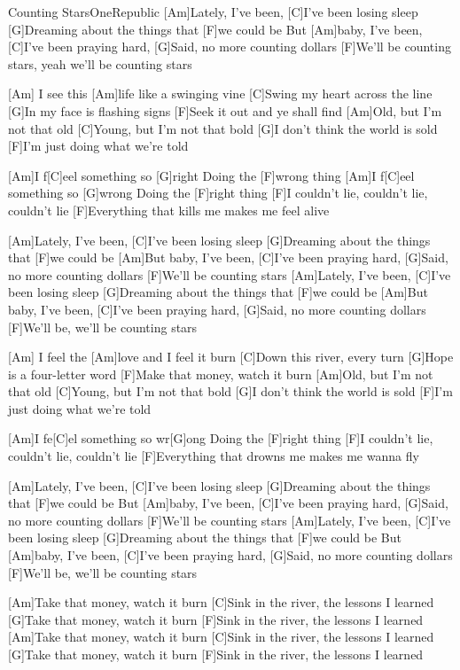 \documentclass[../main.tex]{subfiles}
\begin{document}
\begin{song}[4]{Counting Stars}{OneRepublic}{}
[Am]Lately, I've been, [C]I've been losing sleep
[G]Dreaming about the things that [F]we could be
But [Am]baby, I've been, [C]I've been praying hard,
[G]Said, no more counting dollars
[F]We'll be counting stars, yeah we'll be counting stars

[Am] \hh [C] \hh [G] \hh [F] \hh [Am] \hh [C] \hh [G] \hh [F] \hh
I see this [Am]life like a swinging vine
[C]Swing my heart across the line
[G]In my face is flashing signs
[F]Seek it out and ye shall find
[Am]Old, but I'm not that old
[C]Young, but I'm not that bold
[G]I don't think the world is sold
[F]I'm just doing what we're told

[Am]I\hspace{2.5mm} f[C]eel something so [G]right
Doing the [F]wrong thing
[Am]I\hspace{2.5mm} f[C]eel something so [G]wrong
Doing the [F]right thing
[F]I couldn't lie, couldn't lie, couldn't lie
[F]Everything that kills me makes me feel alive

[Am]Lately, I've been, [C]I've been losing sleep
[G]Dreaming about the things that [F]we could be
[Am]But baby, I've been, [C]I've been praying hard,
[G]Said, no more counting dollars
[F]We'll be counting stars
[Am]Lately, I've been, [C]I've been losing sleep
[G]Dreaming about the things that [F]we could be
[Am]But baby, I've been, [C]I've been praying hard,
[G]Said, no more counting dollars
[F]We'll be, we'll be counting stars

[Am] \hh [C] \hh [G] \hh [F] \hh [Am] \hh [C] \hh [G] \hh [F] \hh\pagebreak
I feel the [Am]love and I feel it burn
[C]Down this river, every turn
[G]Hope is a four-letter word
[F]Make that money, watch it burn
[Am]Old, but I'm not that old
[C]Young, but I'm not that bold
[G]I don't think the world is sold
[F]I'm just doing what we're told

[Am]I fe[C]el something so wr[G]ong
Doing the [F]right thing
[F]I couldn't lie, couldn't lie, couldn't lie
[F]Everything that drowns me makes me wanna fly

[Am]Lately, I've been, [C]I've been losing sleep
[G]Dreaming about the things that [F]we could be
But [Am]baby, I've been, [C]I've been praying hard,
[G]Said, no more counting dollars
[F]We'll be counting stars
[Am]Lately, I've been, [C]I've been losing sleep
[G]Dreaming about the things that [F]we could be
But [Am]baby, I've been, [C]I've been praying hard,
[G]Said, no more counting dollars
[F]We'll be, we'll be counting stars

[Am]Take that money, watch it burn
[C]Sink in the river, the lessons I learned
[G]Take that money, watch it burn
[F]Sink in the river, the lessons I learned
[Am]Take that money, watch it burn
[C]Sink in the river, the lessons I learned
[G]Take that money, watch it burn
[F]Sink in the river, the lessons I learned

\end{song}
\end{document}
